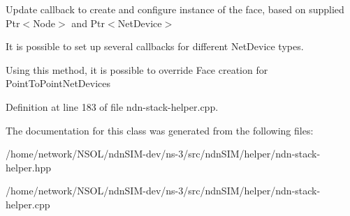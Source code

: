 Update callback to create and configure instance of the face, based on supplied Ptr$<$\+Node$>$ and Ptr$<$\+Net\+Device$>$ 

It is possible to set up several callbacks for different Net\+Device types.

Using this method, it is possible to override Face creation for Point\+To\+Point\+Net\+Devices 

Definition at line 183 of file ndn-\/stack-\/helper.\+cpp.



The documentation for this class was generated from the following files\+:\begin{DoxyCompactItemize}
\item 
/home/network/\+N\+S\+O\+L/ndn\+S\+I\+M-\/dev/ns-\/3/src/ndn\+S\+I\+M/helper/ndn-\/stack-\/helper.\+hpp\item 
/home/network/\+N\+S\+O\+L/ndn\+S\+I\+M-\/dev/ns-\/3/src/ndn\+S\+I\+M/helper/ndn-\/stack-\/helper.\+cpp\end{DoxyCompactItemize}
